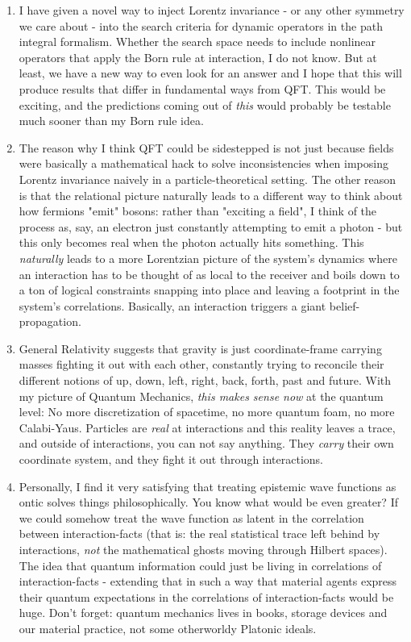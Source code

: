 \documentclass{article}
\begin{document}
\begin{enumerate}

\item I have given a novel way to inject Lorentz invariance - or any other symmetry we care about - into the search criteria for dynamic operators in the path integral formalism. Whether the search space needs to include nonlinear operators that apply the Born rule at interaction, I do not know. But at least, we have a new way to even look for an answer and I hope that this will produce results that differ in fundamental ways from QFT. This would be exciting, and the predictions coming out of \textit{this} would probably be testable much sooner than my Born rule idea.

\item The reason why I think QFT could be sidestepped is not just because fields were basically a mathematical hack to solve inconsistencies when imposing Lorentz invariance naively in a particle-theoretical setting. The other reason is that the relational picture naturally leads to a different way to think about how fermions "emit" bosons: rather than "exciting a field", I think of the process as, say, an electron just constantly attempting to emit a photon - but this only becomes real when the photon actually hits something. This \textit{naturally} leads to a more Lorentzian picture of the system's dynamics where an interaction has to be thought of as local to the receiver and boils down to a ton of logical constraints snapping into place and leaving a footprint in the system's correlations. Basically, an interaction triggers a giant belief-propagation.

\item General Relativity suggests that gravity is just coordinate-frame carrying masses fighting it out with each other, constantly trying to reconcile their different notions of up, down, left, right, back, forth, past and future. With my picture of Quantum Mechanics, \textit{this makes sense now} at the quantum level: No more discretization of spacetime, no more quantum foam, no more Calabi-Yaus. Particles are \textit{real} at interactions and this reality leaves a trace, and outside of interactions, you can not say anything. They \textit{carry} their own coordinate system, and they fight it out through interactions.

\item Personally, I find it very satisfying that treating epistemic wave functions as ontic solves things philosophically. You know what would be even greater? If we could somehow treat the wave function as latent in the correlation between interaction-facts (that is: the real statistical trace left behind by interactions, \textit{not} the mathematical ghosts moving through Hilbert spaces). The idea that quantum information could just be living in correlations of interaction-facts - extending that in such a way that material agents express their quantum expectations in the correlations of interaction-facts would be huge. Don't forget: quantum mechanics lives in books, storage devices and our material practice, not some otherworldy Platonic ideals.


\end{enumerate}
\end{document}
